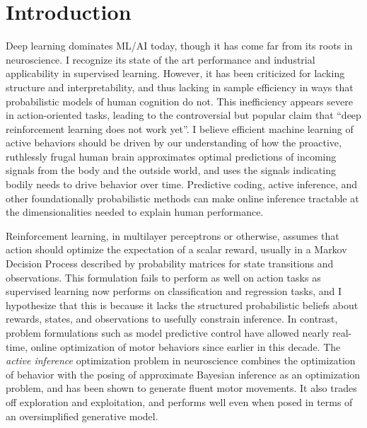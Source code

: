 \section*{Introduction}
\begin{singlespace}
\im
Deep learning dominates ML/AI today, though it has come far from its roots
in neuroscience\cite{hassabis2017neuroscience}.  I recognize its state of
the art performance and industrial applicability in supervised learning.
However, it has been criticized for lacking structure and interpretability,
and thus lacking in sample efficiency in ways that probabilistic models of
human cognition do not\cite{Lake2016}.  This inefficiency appears severe in
action-oriented tasks, leading to the controversial but popular claim that
``deep reinforcement learning does not work yet''\cite{rlblogpost}. I
believe efficient machine learning of active behaviors should be driven by
our understanding of how the proactive, ruthlessly frugal human brain
approximates optimal predictions of incoming signals from the body
and the outside world, and uses the signals indicating bodily needs to drive
behavior over time\cite{probmods,Clark2013}.  Predictive coding,
active inference, and other foundationally probabilistic methods can make
online inference tractable at the dimensionalities needed to explain human
performance\cite{Jonas2014,6386025}.
\end{singlespace}

\begin{singlespace}
Reinforcement learning, in multilayer perceptrons or otherwise, assumes that
action should optimize the expectation of a scalar reward, usually in a Markov
Decision Process described by probability matrices for state transitions and
observations.  This formulation fails to perform as well on action tasks as
supervised learning now performs on classification and regression tasks, and
I hypothesize that this is because it lacks the structured probabilistic
beliefs about rewards, states, and observations to usefully constrain
inference.  In contrast, problem formulations such as model predictive
control have allowed nearly real-time, online optimization of motor
behaviors since earlier in this decade\cite{6386025}.  The \emph{active inference}
optimization problem in neuroscience combines the optimization of behavior
with the posing of approximate Bayesian inference as an optimization
problem, and has been shown to generate fluent motor movements\cite{pio2016active}.  It also
trades off exploration and exploitation, and performs well even when posed
in terms of an oversimplified generative model\cite{Cullen2018}.
\end{singlespace}

